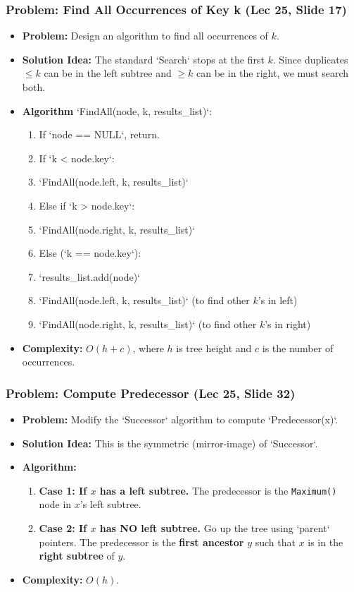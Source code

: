 \subsubsection{Problem: Find All Occurrences of Key k (Lec 25, Slide 17)}
\begin{itemize}
    \item \textbf{Problem:} Design an algorithm to find all occurrences of $k$.
    \item \textbf{Solution Idea:} The standard `Search` stops at the first $k$. Since duplicates $\le k$ can be in the left subtree and $\ge k$ can be in the right, we must search both.
    \item \textbf{Algorithm} `FindAll(node, k, results\_list)`:
    \begin{enumerate}
        \item If `node == NULL`, return.
        \item If `k < node.key`:
        \item `FindAll(node.left, k, results\_list)`
        \item Else if `k > node.key`:
        \item `FindAll(node.right, k, results\_list)`
        \item Else (`k == node.key`):
        \item `results\_list.add(node)`
        \item `FindAll(node.left, k, results\_list)` (to find other $k$'s in left)
        \item `FindAll(node.right, k, results\_list)` (to find other $k$'s in right)
    \end{enumerate}
    \item \textbf{Complexity:} $O(h + c)$, where $h$ is tree height and $c$ is the number of occurrences.
\end{itemize}

\subsubsection{Problem: Compute Predecessor (Lec 25, Slide 32)}
\begin{itemize}
    \item \textbf{Problem:} Modify the `Successor` algorithm to compute `Predecessor(x)`.
    \item \textbf{Solution Idea:} This is the symmetric (mirror-image) of `Successor`.
    \item \textbf{Algorithm:}
    \begin{enumerate}
        \item \textbf{Case 1: If $x$ has a left subtree.}
        The predecessor is the \texttt{Maximum()} node in $x$'s left subtree.
        \item \textbf{Case 2: If $x$ has NO left subtree.}
        Go up the tree using `parent` pointers. The predecessor is the \textbf{first ancestor} $y$ such that $x$ is in the \textbf{right subtree} of $y$.
    \end{enumerate}
    \item \textbf{Complexity:} $O(h)$.
\end{itemize}

